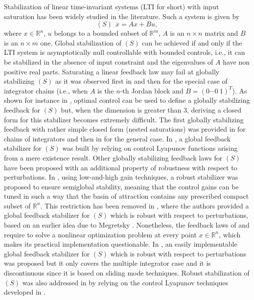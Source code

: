 \documentclass[letterpaper, 10pt]{article}
\begin{document}
Stabilization of linear time-invariant systems (LTI for short) with input saturation has been widely studied in the literature. Such a system is given by $$(S)\ \ \dot x =A x +Bu,$$ where $x\in\mathbb{R}^n$, 
$u$ belongs to a bounded subset of $\mathbb{R}^m$, $A$ is an $n\times n$ matrix and $B$ is an $n\times m$ one. Global stabilization of $(S)$ can be achieved if and only if the LTI system is asymptotically null controllable with bounded controls, i.e., it can be stabilized in the absence of input constraint and the eigenvalues of $A$ have non positive real parts. Saturating a linear feedback law may fail at globally stabilizing $(S)$ as it was observed first in \cite{FULLER69} and then \cite{SY91} for the special case of integrator chains (i.e., when $A$ is the $n$-th Jordan block and $B=(0\cdots 0\ 1)^T$). As shown for instance in \cite{OptCRyan}, optimal control can be used to define a globally stabilizing feedback  for $(S)$ but, when the dimension is greater than $3$, deriving a closed form for this stabilizer becomes extremely difficult. The first globally stabilizing feedback with rather simple closed form (nested saturations) was provided in \cite{Teel92} for chains of integrators and then in \cite{SSY} for the general case. In \cite{Lin95control}, a global feedback stabilizer for $(S)$ was built by relying on control Lyapunov functions arising from a mere existence result. Other globally stabilizing feedback laws for $(S)$ have been proposed with an additional property of robustness with respect to perturbations. In \cite{Saberi:2002ux}, using low-and-high gain techniques, a robust stabilizer was proposed to ensure semiglobal stability, meaning that the control gains can be tuned in such a way that the basin of attraction contains any prescribed compact subset of $\mathbb{R}^n$. This restriction has been removed in \cite{saberi2000}, where the authors provided a global feedback stabilizer for $(S)$ which is robust with respect to perturbations, based on an earlier idea due to Megretsky \cite{Megretski96bibooutput}. Nonetheless, the feedback laws of \cite{saberi2000} and \cite{Megretski96bibooutput} require to solve a nonlinear optimization problem at every point $x\in\mathbb{R}^n$, which makes its practical implementation questionable. In \cite{chitour2015}, an easily implementable global feedback stabilizer for $(S)$ which is robust with respect to perturbations was proposed but it only covers the multiple integrator case and it is discontinuous since it is based on sliding mode techniques. Robust stabilization of $(S)$ was also addressed in \cite{AZCHCHGR15} by relying on the control Lyapunov techniques developed in \cite{Lin95control}.
\end{document}
